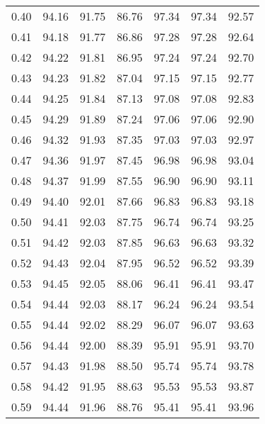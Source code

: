 \begin{tabular}{|c|c|c|c|c|c|c|}
      0.40 &     94.16 &     91.75 &      86.76 &   97.34 &      97.34 &         92.57 \\
      0.41 &     94.18 &     91.77 &      86.86 &   97.28 &      97.28 &         92.64 \\
      0.42 &     94.22 &     91.81 &      86.95 &   97.24 &      97.24 &         92.70 \\
      0.43 &     94.23 &     91.82 &      87.04 &   97.15 &      97.15 &         92.77 \\
      0.44 &     94.25 &     91.84 &      87.13 &   97.08 &      97.08 &         92.83 \\
      0.45 &     94.29 &     91.89 &      87.24 &   97.06 &      97.06 &         92.90 \\
      0.46 &     94.32 &     91.93 &      87.35 &   97.03 &      97.03 &         92.97 \\
      0.47 &     94.36 &     91.97 &      87.45 &   96.98 &      96.98 &         93.04 \\
      0.48 &     94.37 &     91.99 &      87.55 &   96.90 &      96.90 &         93.11 \\
      0.49 &     94.40 &     92.01 &      87.66 &   96.83 &      96.83 &         93.18 \\
      0.50 &     94.41 &     92.03 &      87.75 &   96.74 &      96.74 &         93.25 \\
      0.51 &     94.42 &     92.03 &      87.85 &   96.63 &      96.63 &         93.32 \\
      0.52 &     94.43 &     92.04 &      87.95 &   96.52 &      96.52 &         93.39 \\
      0.53 &     94.45 &     92.05 &      88.06 &   96.41 &      96.41 &         93.47 \\
      0.54 &     94.44 &     92.03 &      88.17 &   96.24 &      96.24 &         93.54 \\
      0.55 &     94.44 &     92.02 &      88.29 &   96.07 &      96.07 &         93.63 \\
      0.56 &     94.44 &     92.00 &      88.39 &   95.91 &      95.91 &         93.70 \\
      0.57 &     94.43 &     91.98 &      88.50 &   95.74 &      95.74 &         93.78 \\
      0.58 &     94.42 &     91.95 &      88.63 &   95.53 &      95.53 &         93.87 \\
      0.59 &     94.44 &     91.96 &      88.76 &   95.41 &      95.41 &         93.96 \\

\end{tabular}
